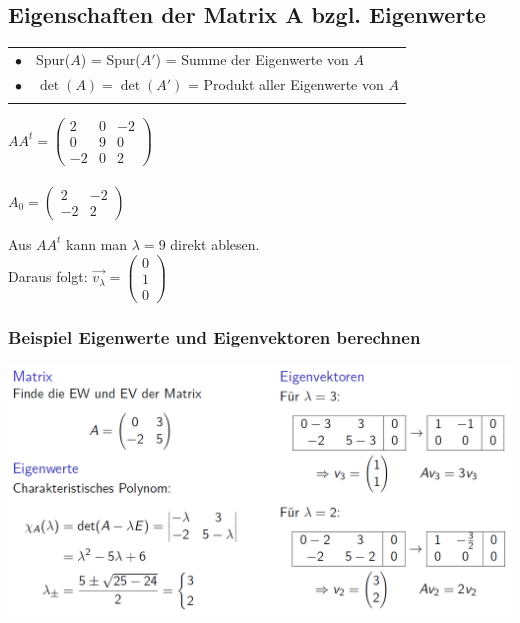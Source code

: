 			
			\subsection{Eigenschaften der Matrix A bzgl. Eigenwerte}
			\begin{tabular}{ll}
			$\bullet$ & Spur($A$) = Spur($A'$) = Summe der Eigenwerte von $A$ \\
			$\bullet$ & $\det(A) = \det(A')$ = Produkt aller Eigenwerte von $A$\\
			\\
			\end{tabular}
			
			\begin{minipage}{0.35\linewidth}
			$AA^t = \begin{pmatrix} 2 & 0 & -2 \\ 0 & 9 & 0 \\ -2 & 0 & 2 \end{pmatrix}$ \\
			\\
			$A_0 = \begin{pmatrix}2 & -2 \\ -2 & 2 \end{pmatrix}$						
			
			\end{minipage}	
			\hfill
			\begin{minipage}{0.55\linewidth}
			
			Aus $AA^t$ kann man $\lambda = 9$ direkt ablesen. \\
			
			Daraus folgt: $\vec{v_{\lambda}} = \begin{pmatrix} 0 \\ 1 \\ 0 \end{pmatrix}$	
			\end{minipage}					   
		   
		   
		   
		   
		   
				\subsubsection{Beispiel Eigenwerte und Eigenvektoren berechnen}
		 \includegraphics[width=0.85\linewidth]{Bilder/eigenwerte-eigenvektoren} \\
		 
